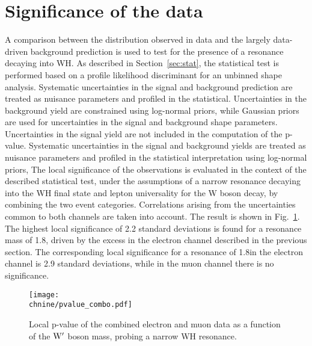 \section{Significance of the data}\label{sec:signif8TeV}

A comparison between the \mWH distribution observed in data and the largely data-driven
background prediction is used to test for the presence of a resonance decaying into WH.
As described in Section~\ref{sec:stat}, the statistical test is performed based on a profile likelihood discriminant for an unbinned shape analysis.
Systematic uncertainties in the signal and background prediction are treated as nuisance parameters and profiled in the statistical.
Uncertainties in the background yield are constrained using log-normal priors, while Gaussian priors are used for uncertainties in the signal and background shape parameters.
Uncertainties in the signal yield are not included in the computation of the p-value.
Systematic uncertainties in the signal and background yields are treated as nuisance parameters and profiled in the statistical interpretation using log-normal priors,
The local significance of the observations is evaluated in the context of the described statistical test,
under the assumptions of a narrow resonance decaying into the WH final state and lepton universality for the W boson decay, by combining the two event categories.
Correlations arising from the uncertainties common to both channels are taken into account.
The result is shown in Fig.~\ref{fig:sigWH}. The highest local significance of 2.2 standard deviations is found for a resonance mass of 1.8\TeV, driven by the excess in the electron channel described in the previous section.
The corresponding local significance for a resonance of 1.8\TeV in the electron channel is 2.9 standard deviations, while in the muon channel there is no significance.

\begin{figure}[!htb]
\centering
     \texttt{[image: \\chnine/pvalue\_combo.pdf]}
\caption{
  Local p-value of the combined electron and muon data as a function of the $\mathrm{W}^\prime$ boson mass,
  probing a narrow WH resonance.
}
\label{fig:sigWH}
\end{figure}

